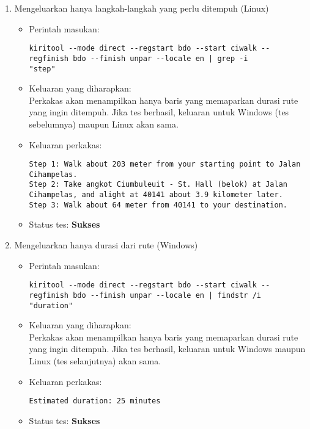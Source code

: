\begin{enumerate}
	\item Mengeluarkan hanya langkah-langkah yang perlu ditempuh (Linux)
	\begin{itemize}
		\item Perintah masukan:
		\begin{lstlisting}
kiritool --mode direct --regstart bdo --start ciwalk --regfinish bdo --finish unpar --locale en | grep -i
"step"
		\end{lstlisting}
		\item Keluaran yang diharapkan: \\
		Perkakas akan menampilkan hanya baris yang memaparkan durasi rute yang ingin ditempuh. Jika tes berhasil, keluaran untuk Windows (tes sebelumnya) maupun Linux akan sama.
		\item Keluaran perkakas:
		\begin{lstlisting}
Step 1: Walk about 203 meter from your starting point to Jalan Cihampelas.
Step 2: Take angkot Ciumbuleuit - St. Hall (belok) at Jalan Cihampelas, and alight at 40141 about 3.9 kilometer later.
Step 3: Walk about 64 meter from 40141 to your destination.
		\end{lstlisting}
		\item Status tes: \textbf{Sukses}
	\end{itemize}
	
	\item Mengeluarkan hanya durasi dari rute (Windows)
	\begin{itemize}
		\item Perintah masukan:
		\begin{lstlisting}
kiritool --mode direct --regstart bdo --start ciwalk --regfinish bdo --finish unpar --locale en | findstr /i
"duration"
		\end{lstlisting}
		\item Keluaran yang diharapkan: \\
		Perkakas akan menampilkan hanya baris yang memaparkan durasi rute yang ingin ditempuh. Jika tes berhasil, keluaran untuk Windows maupun Linux (tes selanjutnya) akan sama.
		\item Keluaran perkakas:
		\begin{lstlisting}
Estimated duration: 25 minutes
		\end{lstlisting}
		\item Status tes: \textbf{Sukses}
	\end{itemize}
	

\end{enumerate}
